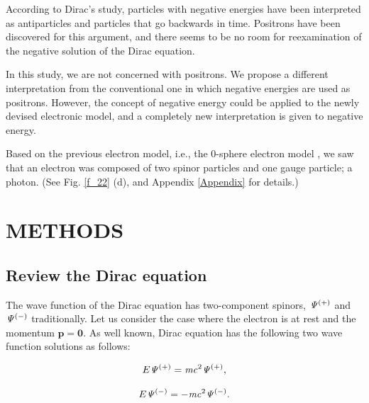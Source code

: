 \documentclass[%
 reprint,
 amsmath,amssymb,
 aps,
]{revtex4-1}
\numberwithin{equation}{section}%
\begin{document}
    
    According to Dirac's study, particles with negative energies have been interpreted as antiparticles and particles that go backwards in time. Positrons have been discovered for this argument, and there seems to be no room for reexamination of the negative solution of the Dirac equation.

    
    In this study, we are not concerned with positrons. We propose a different interpretation from the conventional one in which negative energies are used as positrons. However, the concept of negative energy could be applied to the newly devised electronic model, and a completely new interpretation is given to negative energy.

    Based on the previous electron model, i.e., the 0-sphere electron model \cite{Hanamura1} \cite{Hanamura6}, we saw that an electron was composed of two spinor particles and one gauge particle; a photon. (See Fig. \ref{f_22} ($\bm{\mathrm{d}}$), and Appendix \ref{Appendix} for details.)
    

\section{\label{sec:METHODS}METHODS}


\subsection{
    \label{sec:Review the Dirac equation}
        Review the Dirac equation}


    The wave function of the Dirac equation has two-component spinors, $\it \Psi^{(+)}$ and $\it \Psi^{(-)}$ traditionally. Let us consider the case where the electron is at rest and the momentum $ \bm{p} = \bm{0} $. As well known, Dirac equation has the following two wave function solutions as follows:

        \begin{equation}
            E \it\Psi^{(+)} = m c^{\mathrm{2}} \it\Psi^{(+)}
            \\,
            \label{e_Psy_1}
        \end{equation}

        \begin{equation}
            E \it\Psi^{(-)} = - m c^{\mathrm{2}} \it\Psi^{(-)}
            \\.
            \label{e_Psy_2}
        \end{equation}
\end{document}
